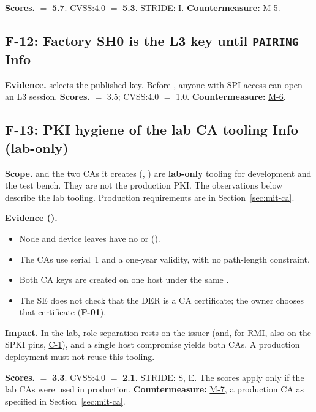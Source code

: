 \documentclass[11pt,a4paper]{article}
\newcommand{\sev}[1]{\textbf{#1}}
\newcommand{\fid}[1]{\textbf{#1}}
\begin{document}
\textbf{Scores.}  $=$ \textbf{5.7}. CVSS:4.0 $=$ \textbf{5.3}. STRIDE: I. \textbf{Countermeasure:} \hyperref[m:M-5]{M-5}.

\subsection*{F-12: Factory SH0 is the L3 key until \texttt{PAIRING} \hfill \sev{Info}}\label{f:F-12}
\textbf{Evidence.}  selects the published  key. Before , anyone with SPI access can open an L3 session. \textbf{Scores.}  $=$ 3.5; CVSS:4.0 $=$ 1.0. \textbf{Countermeasure:} \hyperref[m:M-6]{M-6}.

\subsection*{F-13: PKI hygiene of the lab CA tooling \hfill \sev{Info} (lab-only)}\label{f:F-13}
\textbf{Scope.}  and the two CAs it creates (, ) are \textbf{lab-only} tooling for development and the test bench. They are not the production PKI. The observations below describe the lab tooling. Production requirements are in Section~\ref{sec:mit-ca}.

\textbf{Evidence ().}
\begin{itemize}
\item Node and device leaves have no  or  ().
\item The CAs use serial~1 and a one-year validity, with no path-length constraint.
\item Both CA keys are created on one host under the same .
\item The SE does not check that the  DER is a CA certificate; the owner chooses that certificate (\hyperref[f:F-01]{\fid{F-01}}).
\end{itemize}
\textbf{Impact.} In the lab, role separation rests on the issuer (and, for RMI, also on the SPKI pins, \hyperref[c:C-1]{C-1}), and a single host compromise yields both CAs. A production deployment must not reuse this tooling.

\textbf{Scores.}  $=$ \textbf{3.3}. CVSS:4.0 $=$ \textbf{2.1}. STRIDE: S, E. The scores apply only if the lab CAs were used in production. \textbf{Countermeasure:} \hyperref[m:M-7]{M-7}, a production CA as specified in Section~\ref{sec:mit-ca}.
\end{document}
